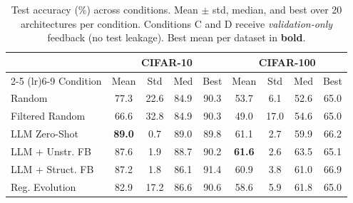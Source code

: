 \begin{table}[t]
\centering\small
\caption{Test accuracy (\%) across conditions. Mean $\pm$ std, median, and best over 20 architectures per condition. Conditions C and D receive \emph{validation-only} feedback (no test leakage). Best mean per dataset in \textbf{bold}.}
\label{tab:main}
\begin{tabular}{@{}l cccc cccc@{}}
\toprule
& \multicolumn{4}{c}{CIFAR-10} & \multicolumn{4}{c}{CIFAR-100} \\
\cmidrule(lr){2-5} \cmidrule(lr){6-9}
Condition & Mean & Std & Med & Best & Mean & Std & Med & Best \\
\midrule
Random & 77.3 & 22.6 & 84.9 & 90.3 & 53.7 & 6.1 & 52.6 & 65.0 \\
Filtered Random & 66.6 & 32.8 & 84.9 & 90.3 & 49.0 & 17.0 & 54.6 & 65.0 \\
LLM Zero-Shot & \textbf{89.0} & 0.7 & 89.0 & 89.8 & 61.1 & 2.7 & 59.9 & 66.2 \\
LLM + Unstr. FB & 87.6 & 1.9 & 88.7 & 90.2 & \textbf{61.6} & 2.6 & 63.5 & 65.1 \\
LLM + Struct. FB & 87.2 & 1.8 & 86.1 & 91.4 & 60.9 & 3.8 & 61.0 & 66.9 \\
Reg. Evolution & 82.9 & 17.2 & 86.6 & 90.6 & 58.6 & 5.9 & 61.8 & 65.0 \\
\bottomrule
\end{tabular}
\end{table}